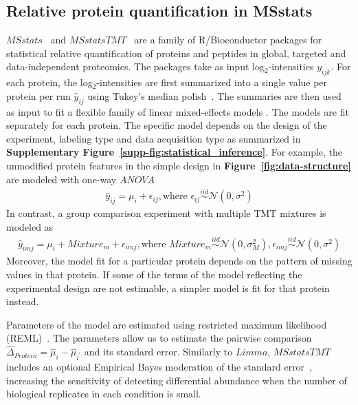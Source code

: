 \documentclass[mcp]{article}
\numberwithin{table}{section}
\def\figref#1{{\bf Figure~\ref{fig:#1}}}
\begin{document}
\subsection*{Relative protein quantification in MSstats}

$MSstats$~\cite{Choi:2014} and $MSstatsTMT$~\cite{Huang:2020} are a family of R/Bioconductor packages for statistical relative quantification of proteins and peptides in global, targeted and data-independent proteomics. The packages take as input log$_2$-intensities $y_{ijk}$. For each protein, the log$_2$-intensities are first summarized into a single value per protein per run $\hat{y}_{ij}$ using Tukey's median polish~\cite{Tukey:1977}. The summaries are then used as input to fit a flexible family of linear mixed-effects models \cite{McLean:1991, Faraway:2006, Bolker2009}. The models are fit separately for each protein. The specific model depends on the design of the experiment, labeling type and data acquisition type as summarized in {\bf Supplementary Figure~\ref{supp-fig:statistical_inference}}. For example, the unmodified protein features in the simple design in \figref{data-structure} are modeled with one-way $ANOVA$
\begin{eqnarray}
\hat{y}_{ij} = \mu_i + \epsilon_{ij}, \text{where } \epsilon_{ij} \stackrel{iid}{\sim} \mathcal{N}(0, \sigma^2)
\label{eq:msstats_model}
\end{eqnarray}
In contrast, a group comparison experiment with multiple TMT mixtures is modeled as
\begin{eqnarray}
\hat{y}_{imj} = \mu_i + Mixture_m + \epsilon_{imj}, \text{where } Mixture_m \stackrel{iid}{\sim} \mathcal{N}(0, \sigma_M^2), \epsilon_{imj} \stackrel{iid}{\sim} \mathcal{N}(0, \sigma^2)
\label{eq:msstatstmt_model}
\end{eqnarray}
Moreover, the model fit for a particular protein depends on the pattern of missing values in that protein. If some of the terms of the model reflecting the experimental design are not estimable, a simpler model is fit for that protein instead.

Parameters of the model are estimated using restricted maximum likelihood (REML)~\cite{Kenward}.
The parameters allow us to estimate the pairwise comparison $\hat{\Delta}_{Protein} = \hat{\mu}_{i} - \hat{\mu}_{i^{\prime}}$ and its standard error. Similarly to $Limma$, $MSstatsTMT$ includes an optional Empirical Bayes moderation of the standard error~\cite{Huang:2020},  increasing the sensitivity of detecting differential abundance when the number of biological replicates in each condition is small. 
\end{document}
